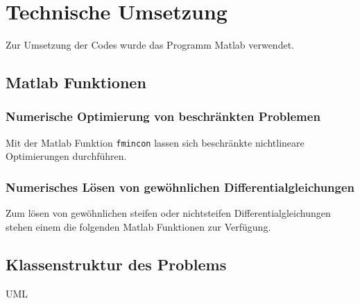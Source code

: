 \chapter{Technische Umsetzung}

Zur Umsetzung der Codes wurde das Programm Matlab verwendet.

\section{Matlab Funktionen}

\subsection{Numerische Optimierung von beschränkten Problemen}
Mit der Matlab Funktion \verb|fmincon| lassen sich beschränkte nichtlineare Optimierungen durchführen.


\subsection{Numerisches Lösen von gewöhnlichen Differentialgleichungen}
Zum lösen von gewöhnlichen steifen oder nichtsteifen Differentialgleichungen stehen einem die folgenden Matlab Funktionen zur Verfügung.









\section{Klassenstruktur des Problems}

UML

